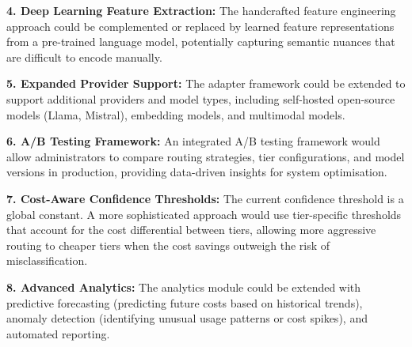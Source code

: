 \documentclass[oneside,12pt,a4paper]{report}
\begin{document}
\textbf{4. Deep Learning Feature Extraction:} The handcrafted feature engineering approach could be complemented or replaced by learned feature representations from a pre-trained language model, potentially capturing semantic nuances that are difficult to encode manually.

\textbf{5. Expanded Provider Support:} The adapter framework could be extended to support additional providers and model types, including self-hosted open-source models (Llama, Mistral), embedding models, and multimodal models.

\textbf{6. A/B Testing Framework:} An integrated A/B testing framework would allow administrators to compare routing strategies, tier configurations, and model versions in production, providing data-driven insights for system optimisation.

\textbf{7. Cost-Aware Confidence Thresholds:} The current confidence threshold is a global constant. A more sophisticated approach would use tier-specific thresholds that account for the cost differential between tiers, allowing more aggressive routing to cheaper tiers when the cost savings outweigh the risk of misclassification.

\textbf{8. Advanced Analytics:} The analytics module could be extended with predictive forecasting (predicting future costs based on historical trends), anomaly detection (identifying unusual usage patterns or cost spikes), and automated reporting.
\end{document}
